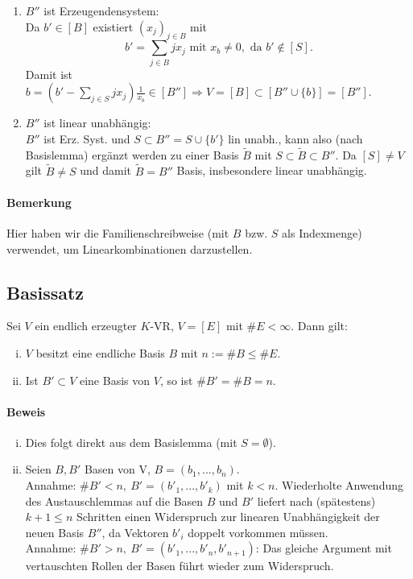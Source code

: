  		\begin{enumerate}
 			\item $B''$ ist Erzeugendensystem:\\
 			      Da $b'\in [B]$ existiert $(x_j)_{j\in B}$ mit
 			      \[
 			      	b' = \sum_{j\in B} jx_j \text{ mit } x_b \neq 0, \text{ da } b' \notin [S].
 			      \]
 			      Damit ist $b=(b'-\sum_{j\in S} jx_j)\frac{1}{x_b} \in [B''] \Rightarrow V = [B] \subset [B'' \cup \{b\}] =  [B'']$.

 			\item $B''$ ist linear unabhängig:\\
 			      $B''$ ist Erz. Syst. und $S\subset B'' = S \cup \{b'\}$ lin unabh., kann also (nach Basislemma) ergänzt werden zu einer Basis $\tilde{B}$ mit $S\subset \tilde{B}\subset B''$.
 			      Da $[S] \neq V$ gilt $\tilde{B} \neq S$ und damit $\tilde{B} = B''$ Basis, insbesondere linear unabhängig.
 		\end{enumerate}

 	\paragraph{Bemerkung}
 		Hier haben wir die Familienschreibweise (mit $B$ bzw. $S$ als Indexmenge) verwendet, um Linearkombinationen darzustellen.

 \subsection{Basissatz}
 	\begin{Satz}[Basissatz]
 		Sei $V$ ein endlich erzeugter $K$-VR, $V=[E]$ mit $\#E < \infty$. Dann gilt:
 		\begin{enumerate}[(i)]
 			\item $V$ besitzt eine endliche Basis $B$ mit $n:= \#B \leq \#E$.
 			\item Ist $B'\subset V$ eine Basis von $V$, so ist $\#B' = \#B = n$.
 		\end{enumerate}
 	\end{Satz}

 	\paragraph{Beweis}
 		\begin{enumerate}[(i)]
 			\item  Dies folgt direkt aus dem Basislemma (mit $S=\emptyset$).
 			\item Seien $B,B'$ Basen von V, $B = (b_1,...,b_n)$.\\
 			      Annahme: $\#B' < n,\ B' = (b'_1,...,b'_k)$ mit $k < n$. Wiederholte Anwendung des Austauschlemmas auf die Basen $B$ und $B'$ liefert nach (spätestens) $k+1\leq n$ Schritten einen Widerspruch zur linearen Unabhängigkeit der neuen Basis $B''$, da Vektoren $b'_i$ doppelt vorkommen müssen.\\
 			      Annahme: $\#B' > n,\ B' = (b'_1,...,b'_n,b'_{n+1})$: Das gleiche Argument mit vertauschten Rollen der Basen führt wieder zum Widerspruch.
 		\end{enumerate}

